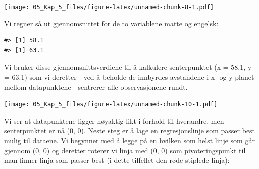 \documentclass[
]{article}
\newenvironment{Shaded}{\begin{snugshade}}{\end{snugshade}}
\newcommand{\AttributeTok}[1]{\textcolor[rgb]{0.77,0.63,0.00}{#1}}
\newcommand{\CommentTok}[1]{\textcolor[rgb]{0.56,0.35,0.01}{\textit{#1}}}
\newcommand{\ConstantTok}[1]{\textcolor[rgb]{0.00,0.00,0.00}{#1}}
\newcommand{\ControlFlowTok}[1]{\textcolor[rgb]{0.13,0.29,0.53}{\textbf{#1}}}
\newcommand{\DecValTok}[1]{\textcolor[rgb]{0.00,0.00,0.81}{#1}}
\newcommand{\FunctionTok}[1]{\textcolor[rgb]{0.00,0.00,0.00}{#1}}
\newcommand{\NormalTok}[1]{#1}
\newcommand{\OtherTok}[1]{\textcolor[rgb]{0.56,0.35,0.01}{#1}}
\newcommand{\SpecialCharTok}[1]{\textcolor[rgb]{0.00,0.00,0.00}{#1}}
\newcommand{\StringTok}[1]{\textcolor[rgb]{0.31,0.60,0.02}{#1}}
\begin{document}
\begin{Shaded}
\end{Shaded}

\texttt{[image: 05\_Kap\_5\_files/figure-latex/unnamed-chunk-8-1.pdf]}

Vi regner så ut gjennomsnittet for de to variablene matte og engelsk:

\begin{verbatim}
#> [1] 58.1
#> [1] 63.1
\end{verbatim}

Vi bruker disse gjennomsnittsverdiene til å kalkulere senterpunktet (x = 58.1, y = 63.1) som vi deretter - ved å beholde de innbyrdes avstandene i x- og y-planet mellom datapunktene - sentrerer alle observasjonene rundt.

\begin{Shaded}
\end{Shaded}

\texttt{[image: 05\_Kap\_5\_files/figure-latex/unnamed-chunk-10-1.pdf]}

Vi ser at datapunktene ligger nøyaktig likt i forhold til hverandre, men senterpunktet er nå (0, 0). Neste steg er å lage en regresjonslinje som passer best mulig til dataene. Vi begynner med å legge på en hvilken som helst linje som går gjennom (0, 0) og deretter roterer vi linja med (0, 0) som pivoteringspunkt til man finner linja som passer best (i dette tilfellet den røde stiplede linja):
\end{document}

